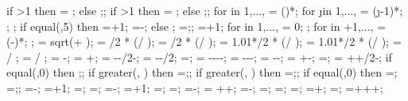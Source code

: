 {{if \storynumber>1 then {\nlevmo = ;} else {;};
if \baynumber>1 then {\ncolmo = ;} else {;};
for \iii in {1,...,{\levelnumber}}{
\y{\iii} = ()*\storyheight;
for \j in {1,...,{\columnnumber}}{
\x{\j} = (\j-1)*\baywidth;
};
};
if equal(\showsupports,5) then
{=\subfloors+1;
\superstorynumber=\storynumber-\subfloors;}
else
{;
\superstorynumber=\storynumber;};
=+1;
for \idefl in {1,...,{}}{
	 = 0;
};
for \idefl in {+1,...,{\levelnumber}}{
	 = (\idefl-)*\drift;
};
\tempdim = sqrt( + );
\fixbeamx = \collinet/2 * ( / \tempdim);
\fixbeamy = \collinet/2 * ( / \tempdim);
\fixcoly = 1.01*\beamlinet/2 * ( / \tempdim);
\fixcolx = 1.01*\beamlinet/2 * ( / \tempdim);
 =  / \storyheight * \baywidth;
 =  / \storyheight * \baywidth;
\rigbasestartx = -\supportwidth;
\rigbaseendx = \x{\columnnumber}+\supportwidth;
\isoboty = -\supportheight-\baselinet/2-\isolationdepth;
\isotopy = -\supportheight-\baselinet/2;
\isodeflx=\isodeflratio*\isolationdepth*\showdefl;
\foundboty = -\supportheight-\baselinet-\isolationdepth-\foundationdepth;
\foundtopy = -\supportheight-\baselinet-\isolationdepth;
\foundstartx = -\foundsidew-\isodeflx;
\foundendx = \x{\columnnumber}+\foundsidew-\isodeflx;
\structheight=\storynumber*\storyheight;
\isomidy = \supportheight+\isolinet+\isolationdepth/2-\baselinet;
if equal(\subfloors,0) then {;};
if greater(\leftstory, \subfloors) then {\leftstory=\subfloors;};
if greater(\rightstory, \subfloors) then {\rightstory=\subfloors;};
if equal(\showopenstory,0) then
{\leftstory=\subfloors;
\rightstory=\subfloors;};
\leftopenstory=\subfloors-\leftstory;
\leftlevel=\leftstory+1;
\leftwallh=\leftstory*\storyheight;
\leftopenh=\leftopenstory*\storyheight;
\rightopenstory=\subfloors-\rightstory;
\rightlevel=\rightstory+1;
\rightwallh=\rightstory*\storyheight;
\rightopenh=\rightopenstory*\storyheight;
\diffwallh=\leftwallh-\rightwallh;
\soilbelowfoundtof = \soilbelowfound+\supportheight+\hsdistbottom;
\basewallstartx=-\supportwidth;
\buildingwidth=\baynumber*\baywidth;
\basewalldepth=\subfloors*\storyheight;
\basewallstarty=\basewalldepth;
\basewallendx=\buildingwidth+\supportwidth;
\basewallendy=\basewallstarty;
\rightsoilx=\hsdistright+\supportwidth+\buildingwidth+\rightsoildist;
}}
